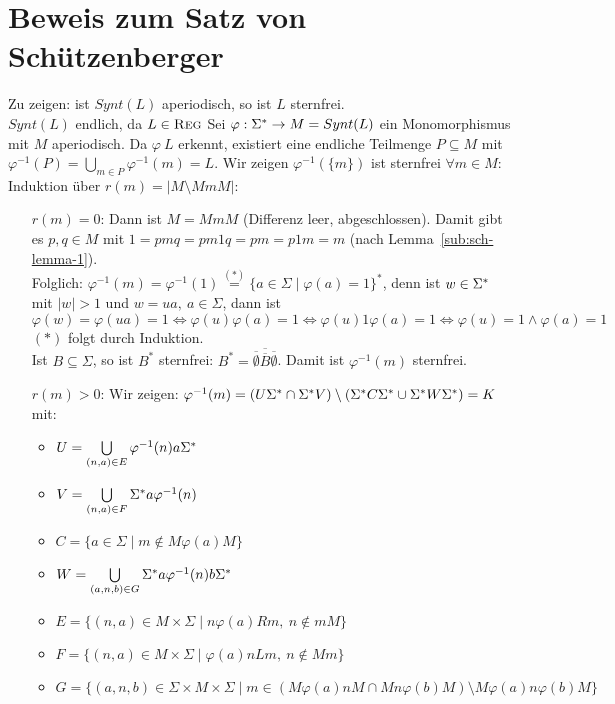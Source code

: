 \section{Beweis zum Satz von Schützenberger}
    Zu zeigen: ist $Synt(L)$ aperiodisch, so ist $L$ sternfrei.\\
    $Synt(L)$ endlich, da $L\in \textsc{Reg}$
    Sei $\varphi:\Sigma^*\rightarrow M=Synt(L)$ ein Monomorphismus mit $M$ aperiodisch. Da $\varphi\ L$ erkennt, existiert eine endliche Teilmenge $P\subseteq M$ mit $\varphi^{-1}(P)=\bigcup\limits_{m\in P}\varphi^{-1}(m)=L$. Wir zeigen $\varphi^{-1}(\{m\})$ ist sternfrei $\forall m\in M$:\\
    Induktion über $r(m)=|M\setminus MmM|$:
    \begin{itemize}
        \item[$r(m)=0$:] Dann ist $M=MmM$ (Differenz leer, abgeschlossen). Damit gibt es $p,q\in M$ mit $1=pmq=pm1q=pm=p1m=m$ (nach Lemma~\ref{sub:sch-lemma-1}).\\
        Folglich: $\varphi^{-1}(m)=\varphi^{-1}(1)\overset{(*)}{=}\{a\in\Sigma\mid\varphi(a)=1\}^*$, denn ist $w\in \Sigma^*$ mit $|w|>1$ und $w=ua,\ a\in \Sigma$, dann ist $$\varphi(w)=\varphi(ua)=1\Leftrightarrow \varphi(u)\varphi(a)=1\Leftrightarrow \varphi(u)1\varphi(a)=1\Leftrightarrow \varphi(u)=1\wedge \varphi(a)=1$$
        $(*)$ folgt durch Induktion.\\
        Ist $B\subseteq \Sigma$, so ist $B^*$ sternfrei: $B^*=\overline{\overline{\emptyset}\overline{B}\overline{\emptyset}}$. Damit ist $\varphi^{-1}(m)$ sternfrei.
        \item[$r(m)>0$:] Wir zeigen: $\varphi^{-1}(m)=(U\Sigma^*\cap \Sigma^* V)\setminus(\Sigma^* C\Sigma^*\cup \Sigma^* W\Sigma^*)=K$ mit:
        \begin{itemize}
            \item $U=\bigcup\limits_{(n,a)\in E} \varphi^{-1}(n)a\Sigma^*$
            \item $V=\bigcup\limits_{(n,a)\in F} \Sigma^* a\varphi^{-1}(n)$
            \item $C=\{a\in\Sigma\mid m\not\in M\varphi(a)M\}$
            \item $W=\bigcup\limits_{(a,n,b)\in G}\Sigma^* a\varphi^{-1}(n)b\Sigma^*$
            \item $E=\{(n,a)\in M\times \Sigma\mid n\varphi(a)Rm,\ n\not\in mM\}$
            \item $F=\{(n,a)\in M\times \Sigma\mid \varphi(a)nLm,\ n\not\in Mm\}$
            \item $G=\{(a,n,b)\in \Sigma\times M\times \Sigma\mid m\in \left(M\varphi(a)nM\cap Mn\varphi(b)M\right)\setminus M\varphi(a)n\varphi(b)M\}$

\end{itemize}
\end{itemize}
